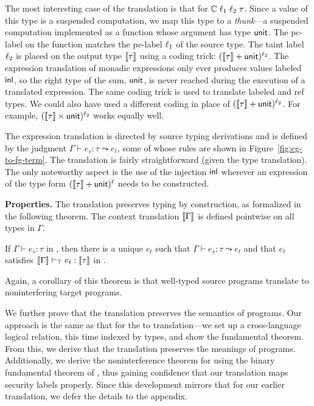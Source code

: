 The most interesting case of the translation is that for
$\mathbb{C}\;\ell_1\;\ell_2\;\tau$. Since a {\cg} value of this type
is a suspended computation, we map this type to a \emph{thunk}---a
suspended computation implemented as a function whose argument has
type $\mathsf{unit}$. The pc-label on the function matches the pc-label
$\ell_1$ of the source type. The taint label $\ell_2$ is placed
on the output type $\llbracket \tau \rrbracket$ using a coding trick: $(\llbracket \tau \rrbracket
+ \mathsf{unit})^{\ell_2}$. The expression translation of monadic
expressions only ever produces values labeled $\mathsf{inl}$, so the right
type of the sum, $\mathsf{unit}$, is never reached during the execution of a
translated expression. The same coding trick is used to translate
labeled and ref types. We could also have used a different coding in
place of $(\llbracket \tau \rrbracket + \mathsf{unit})^{\ell_2}$. For example,
$(\llbracket \tau \rrbracket \times \mathsf{unit})^{\ell_2}$ works equally well.

The expression translation is directed by source typing derivations
and is defined by the judgment $\Gamma \vdash e_s: \tau \leadsto e_t$,
some of whose rules are shown in Figure~\ref{fig:cg-to-fg-term}. The
translation is fairly straightforward (given the type
translation). The only noteworthy aspect is the use of the injection
$\mathsf{inl}$ wherever an expression of the type form $(\llbracket \tau \rrbracket +
\mathsf{unit})^{\ell}$ needs to be constructed.

\medskip \noindent \textbf{Properties.}  The translation preserves
typing by construction, as formalized in the following theorem. The
context translation $\llbracket \Gamma \rrbracket$ is defined pointwise on all types
in $\Gamma$.
%
\begin{thm}\label{thm:cg-2-fg-typePres}
  If $\Gamma \vdash e_s: \tau$ in {\cg}, then there is a unique $e_t$
  such that $\Gamma \vdash e_s: \tau \leadsto e_t$ and that $e_t$
  satisfies $\llbracket \Gamma \rrbracket \vdash_\top e_t: \llbracket \tau \rrbracket$ in {\fg}.
\end{thm}
Again, a corollary of this theorem is that well-typed source programs
translate to noninterfering target programs.

We further prove that the translation preserves the semantics of
programs. Our approach is the same as that for the {\fg} to {\cg}
translation---we set up a cross-language logical relation, this time
indexed by {\cg} types, and show the fundamental theorem. From this,
we derive that the translation preserves the meanings of
programs. Additionally, we derive the noninterference theorem for
{\cg} using the binary fundamental theorem of {\fg}, thus gaining
confidence that our translation maps security labels properly. Since
this development mirrors that for our earlier translation, we defer
the details to the appendix.

